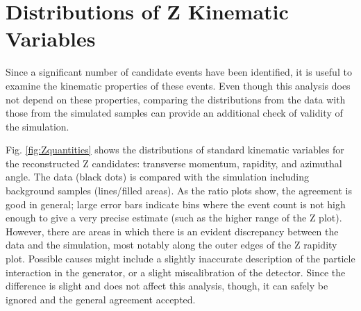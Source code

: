 




\section{Distributions of Z Kinematic Variables} %
\label{res:Zquants}
Since a significant number of \Zee candidate events have been identified, 
it is useful to examine the kinematic properties of these events.  
Even though this analysis does not depend on these properties, 
comparing the distributions from the data with those from the simulated samples 
can provide an additional check of validity of the simulation.  

Fig. \ref{fig:Zquantities} shows the distributions of standard kinematic 
variables for the reconstructed Z candidates: transverse momentum, rapidity, and azimuthal angle. 
The data (black dots) is compared with the simulation including 
background samples (lines/filled areas).  
As the ratio plots show, the agreement is good in general; 
large error bars indicate bins where the event count is not 
high enough to give a very precise estimate 
(such as the higher range of the Z \pt plot).  
However, there are areas in which there is an evident discrepancy 
between the data and the simulation, 
most notably along the outer edges of the Z rapidity plot.  
Possible causes might include a slightly inaccurate description of the particle 
interaction in the generator, 
or a slight miscalibration of the detector.  
Since the difference is slight and does not affect this analysis, though, 
it can safely be ignored and the general agreement accepted.  

